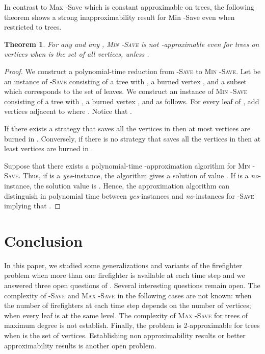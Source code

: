 \documentclass[10pt]{article}
\newcommand{\probtitle}[1]{\textsc{#1}}
\newtheorem{theorem}{Theorem}
\begin{document}
In contrast to {\sc Max -Save} which is constant approximable on trees, the following theorem shows a strong inapproximability result for {\sc Min -Save} even when restricted to trees.


\begin{theorem}
For any  and any , \probtitle{Min -Save} is not -approximable 
even for trees on  vertices when  is the set of all vertices, unless .
\end{theorem}

\begin{proof}
We construct a polynomial-time reduction from \probtitle{-Save} to \probtitle{Min -Save}.
Let  be an instance of \textsc{-Save} consisting of a tree
 with , a burned vertex , and a subset  which corresponds
to the set of leaves. We construct an instance  of
\textsc{Min -Save} consisting of a tree  with , a burned vertex , and  as follows. For every leaf  of , add  vertices adjacent to  where . Notice that .

If there exists a strategy that saves all the vertices in  then at most  vertices are burned in . Conversely, if there is no strategy that saves all the vertices in  then at least  vertices are burned in . 

Suppose that there exists a polynomial-time -approximation algorithm  for \probtitle{Min -Save}. Thus, if  is a \textit{yes}-instance, the algorithm gives a solution of value .
If  is a \textit{no}-instance, the solution value is . Hence, the approximation algorithm  can distinguish in polynomial time between \textit{yes}-instances and \textit{no}-instances for \probtitle{-Save} implying that .
\end{proof}

\section{Conclusion}\label{s:concl}

In this paper, we studied some generalizations and variants of the firefighter problem when more than one firefighter is available at each time step and we answered three open questions of \cite{finbow2009}.
Several interesting questions remain open. The complexity of \probtitle{-Save} and \probtitle{Max -Save} in the following cases are not known: when the number of firefighters at each time step depends on the number of vertices; when every leaf is at the same level. The complexity of \probtitle{Max -Save} for trees of maximum degree  is not establish.
Finally, the problem is 2-approximable for trees when  is the set of vertices. Establishing non approximability results or better approximability results is another open problem.
  







\end{document}
